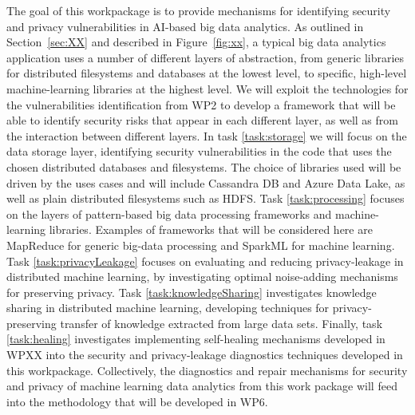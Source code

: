 \begin{Workpackage}{\thewpno}
\begin{WPDescription}
The goal of this workpackage is to provide mechanisms for identifying security and privacy vulnerabilities in AI-based big data analytics. As outlined in Section~\ref{sec:XX} and described in Figure~\ref{fig:xx}, a typical big data analytics application uses a number of different layers of abstraction, from generic libraries for distributed filesystems and databases at the lowest level, to specific, high-level machine-learning libraries at the highest level. We will exploit the technologies for the vulnerabilities identification from WP2 to develop a framework that will be able to identify security risks that appear in each different layer, as well as from the interaction between different layers. In task \ref{task:storage} we will focus on the data storage layer, identifying security vulnerabilities in the code that uses the chosen distributed databases and filesystems. The choice of libraries used will be driven by the uses cases and will include Cassandra DB and Azure Data Lake, as well as plain distributed filesystems such as HDFS. Task \ref{task:processing} focuses on the layers of pattern-based big data processing frameworks and machine-learning libraries. Examples of frameworks that will be considered here are MapReduce for generic big-data processing and SparkML for machine learning. Task \ref{task:privacyLeakage} focuses on evaluating and reducing privacy-leakage in distributed machine learning, by investigating optimal noise-adding mechanisms for preserving privacy. Task \ref{task:knowledgeSharing} investigates knowledge sharing in distributed machine learning, developing techniques for privacy-preserving transfer of knowledge extracted from large data sets. Finally, task \ref{task:healing} investigates implementing self-healing mechanisms developed in WPXX into the security and privacy-leakage diagnostics techniques developed in this workpackage. Collectively, the diagnostics and repair mechanisms for security and privacy of machine learning data analytics from this work package will feed into the \TheProject{} methodology that will be developed in WP6.
\end{WPDescription}

\begin{Task}


\end{Task}
\end{Workpackage}

